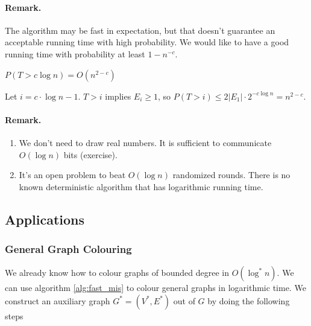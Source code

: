 \paragraph{Remark.} The algorithm may be fast in expectation, but that doesn't guarantee an acceptable running time with high probability. We would like to have a good running time with probability at least $1-n^{-c}$.

\begin{thm} $P(T> c\log n) = O(n^{2-c})$\end{thm}
\begin{pr} Let $i=c\cdot \log n -1$. $T>i$ implies $E_i\geq 1$, so $P(T > i) \leq 2|E_1| \cdot 2^{-c\log n} = n^{2-c}$.\end{pr}

\paragraph{Remark.} \begin{enumerate}
\item We don't need to draw real numbers. It is sufficient to communicate $O(\log n)$ bits (exercise). 
\item It's an open problem to beat $O(\log n)$ randomized rounds. There is no known deterministic algorithm that has logarithmic running time.
\end{enumerate}

\subsection{Applications}

\subsubsection{General Graph Colouring}

We already know how to colour graphs of bounded degree in $O(\log^* n)$. We can use algorithm \ref{alg:fast_mis} to colour general graphs in logarithmic time. We construct an auxiliary graph $G^* = (V^*, E^*)$ out of $G$ by doing the following steps

